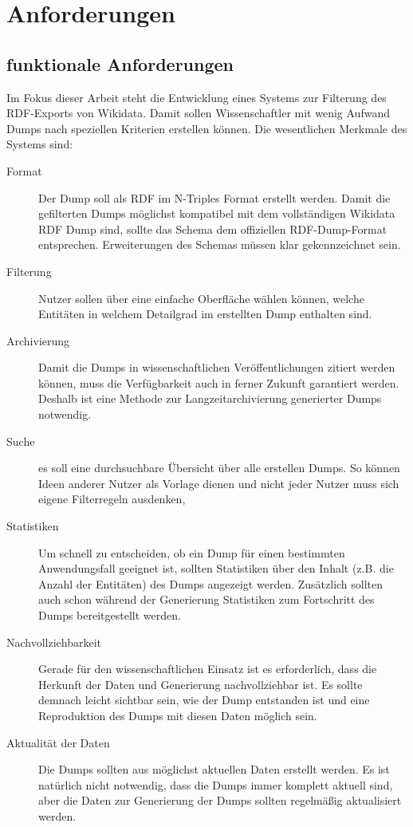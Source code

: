 \chapter{Anforderungen}
\label{chap:requirements}

\section{funktionale Anforderungen}
Im Fokus dieser Arbeit steht die Entwicklung eines Systems zur Filterung des RDF-Exports von Wikidata.
Damit sollen Wissenschaftler mit wenig Aufwand Dumps nach speziellen Kriterien erstellen können.
Die wesentlichen Merkmale des Systems sind:

\begin{description}
  \item[Format] Der Dump soll als RDF im N-Triples Format erstellt werden. Damit die gefilterten Dumps möglichst kompatibel mit dem vollständigen Wikidata RDF Dump sind, sollte das Schema dem offiziellen RDF-Dump-Format entsprechen. Erweiterungen des Schemas müssen klar gekennzeichnet sein.
  \item[Filterung] Nutzer sollen über eine einfache Oberfläche wählen können, welche Entitäten in welchem Detailgrad im erstellten Dump enthalten sind. 
  \item[Archivierung] Damit die Dumps in wissenschaftlichen Veröffentlichungen zitiert werden können, muss die Verfügbarkeit auch in ferner Zukunft garantiert werden. Deshalb ist eine Methode zur Langzeitarchivierung generierter Dumps notwendig. 
  \item[Suche] es soll eine durchsuchbare Übersicht über alle erstellen Dumps.
    So können Ideen anderer Nutzer als Vorlage dienen und nicht jeder Nutzer muss sich eigene Filterregeln ausdenken,
  \item[Statistiken] Um schnell zu entscheiden, ob ein Dump für einen bestimmten Anwendungsfall geeignet ist, sollten Statistiken über den Inhalt (z.B. die Anzahl der Entitäten) des Dumps angezeigt werden. Zusätzlich sollten auch schon während der Generierung Statistiken zum Fortschritt des Dumps bereitgestellt werden.
  \item[Nachvollziehbarkeit] Gerade für den wissenschaftlichen Einsatz ist es erforderlich, dass die Herkunft der Daten und Generierung nachvollziehbar ist. Es sollte demnach leicht sichtbar sein, wie der Dump entstanden ist und eine Reproduktion des Dumps mit diesen Daten möglich sein. 
  \item[Aktualität der Daten] Die Dumps sollten aus möglichst aktuellen Daten erstellt werden.
    Es ist natürlich nicht notwendig, dass die Dumps immer komplett aktuell sind, aber die Daten zur Generierung der Dumps sollten regelmäßig aktualisiert werden.
\end{description}

